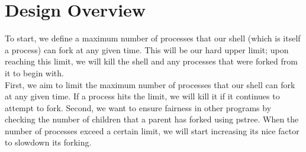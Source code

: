 \documentclass{article}
\begin{document}


 

\section{Design Overview}

To start, we define a maximum number of processes that our shell (which is 
itself a process) can fork at any given time. This will be our hard upper 
limit; upon reaching this limit, we will kill the shell and any processes that
were forked from it to begin with. \\


First, we aim to limit the maximum number of processes that our shell can fork at any given time.  If a process hits the limit, we will kill it if it continues to attempt to fork.
Second, we want to ensure fairness in other programs by checking the number of children that a parent has forked using pstree.  When the number of processes exceed a certain limit, we will start increasing its nice factor to slowdown its forking.
\end{document}
